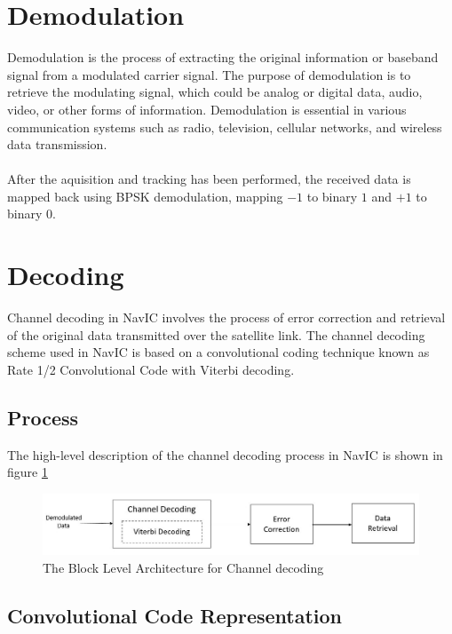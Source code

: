 \section{Demodulation}
Demodulation is the process of extracting the original information or baseband signal from a modulated carrier signal. The purpose of demodulation is to retrieve the modulating signal, which could be analog or digital data, audio, video, or other forms of information. Demodulation is essential in various communication systems such as radio, television, cellular networks, and wireless data transmission.
\\
\\
After the aquisition and tracking has been performed, the received data is mapped back using BPSK demodulation, mapping $-1$ to binary $1$ and $+1$ to binary $0$.

\section{Decoding}
Channel decoding in NavIC involves the process of error correction and retrieval of the original data transmitted over the satellite link. The channel decoding scheme used in NavIC is based on a convolutional coding technique known as Rate 1/2 Convolutional Code with Viterbi decoding.
\subsection{Process}
The high-level description of the channel decoding process in NavIC is shown in figure \ref{fig:decoding_r}
\begin{normalsize}
\begin{figure}[ht]
\centering
\includegraphics[width=1\columnwidth]{figs/decoding_r.jpg}
\centering
\captionsetup{justification=centering}
\caption{The Block Level Architecture for Channel decoding}
\label{fig:decoding_r}
\end{figure}
\end{normalsize}


\subsection{Convolutional Code Representation}

